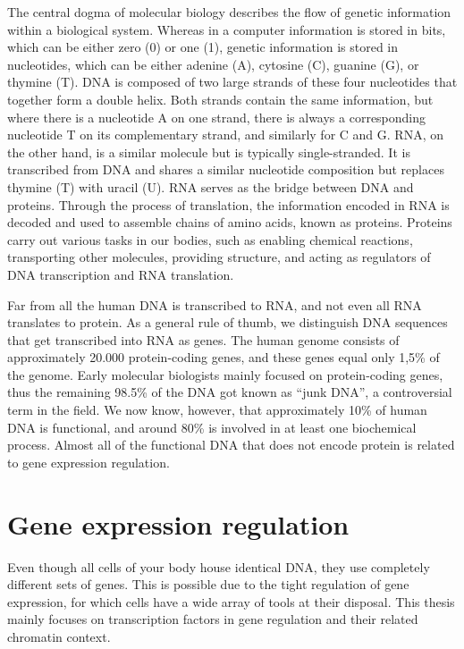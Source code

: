 The central dogma of molecular biology describes the flow of genetic information within a biological system. Whereas in a computer information is stored in bits, which can be either zero (0) or one (1), genetic information is stored in nucleotides, which can be either adenine (A), cytosine (C), guanine (G), or thymine (T). DNA is composed of two large strands of these four nucleotides that together form a double helix. Both strands contain the same information, but where there is a nucleotide A on one strand, there is always a corresponding nucleotide T on its complementary strand, and similarly for C and G. RNA, on the other hand, is a similar molecule but is typically single-stranded. It is transcribed from DNA and shares a similar nucleotide composition but replaces thymine (T) with uracil (U). RNA serves as the bridge between DNA and proteins. Through the process of translation, the information encoded in RNA is decoded and used to assemble chains of amino acids, known as proteins. Proteins carry out various tasks in our bodies, such as enabling chemical reactions, transporting other molecules, providing structure, and acting as regulators of DNA transcription and RNA translation.

Far from all the human DNA is transcribed to RNA, and not even all RNA translates to protein. As a general rule of thumb, we distinguish DNA sequences that get transcribed into RNA as genes. The human genome consists of approximately 20.000 protein-coding genes, and these genes equal only 1,5\% of the genome\cite{Piovesan2019}. Early molecular biologists mainly focused on protein-coding genes, thus the remaining 98.5\% of the DNA got known as ``junk DNA'', a controversial term in the field\cite{Graur2013}. We now know, however, that approximately 10\% of human DNA is functional\cite{Graur2013}, and around 80\% is involved in at least one biochemical process\cite{encode2012}. Almost all of the functional DNA that does not encode protein is related to gene expression regulation.

\section{Gene expression regulation}

Even though all cells of your body house identical DNA, they use completely different sets of genes. This is possible due to the tight regulation of gene expression, for which cells have a wide array of tools at their disposal. This thesis mainly focuses on transcription factors in gene regulation and their related chromatin context.

